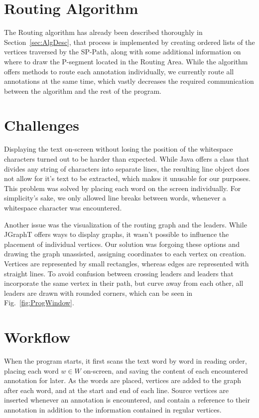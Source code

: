\documentclass[11pt,a4paper]{vutinfth}
\begin{document}
\section{Routing Algorithm}

The Routing algorithm has already been described thoroughly in Section~\ref*{sec:AlgDesc}, that process is implemented by creating ordered lists of the vertices traversed by the SP-Path, along with some additional information on where to draw the P-segment located in the Routing Area. While the algorithm offers methods to route each annotation individually, we currently route all annotations at the same time, which vastly decreases the required communication between the algorithm and the rest of the program.

\section{Challenges}
\label{sec:Challenge}
Displaying the text on-screen without losing the position of the whitespace characters turned out to be harder than expected. While Java offers a class that divides any string of characters into separate lines, the resulting line object does not allow for it's text to be extracted, which makes it unusable for our purposes. This problem was solved by placing each word on the screen individually. For simplicity's sake, we only allowed line breaks between words, whenever a whitespace character was encountered.

Another issue was the visualization of the routing graph and the leaders. While JGraphT offers ways to display graphs, it wasn't possible to influence the placement of individual vertices. Our solution was forgoing these options and drawing the graph unassisted, assigning coordinates to each vertex on creation. Vertices are represented by small rectangles, whereas edges are represented with straight lines. To avoid confusion between crossing leaders and leaders that incorporate the same vertex in their path, but curve away from each other, all leaders are drawn with rounded corners, which can be seen in Fig.~\ref{fig:ProgWindow}.


\section{Workflow}

When the program starts, it first scans the text word by word in reading order, placing each word $w \in W$  on-screen, and saving the content of each encountered annotation for later. As the words are placed, vertices are added to the graph after each word, and at the start and end of each line. Source vertices are inserted whenever an annotation is encountered, and contain a reference to their annotation in addition to the information contained in regular vertices.
\end{document}
